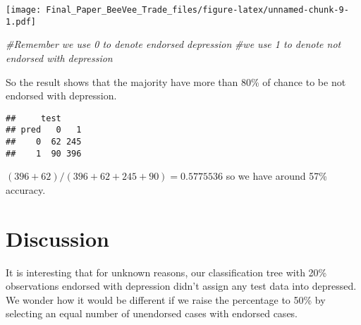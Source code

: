 \documentclass[]{article}
\newenvironment{Shaded}{\begin{snugshade}}{\end{snugshade}}
\newcommand{\KeywordTok}[1]{\textcolor[rgb]{0.13,0.29,0.53}{\textbf{#1}}}
\newcommand{\DataTypeTok}[1]{\textcolor[rgb]{0.13,0.29,0.53}{#1}}
\newcommand{\DecValTok}[1]{\textcolor[rgb]{0.00,0.00,0.81}{#1}}
\newcommand{\FloatTok}[1]{\textcolor[rgb]{0.00,0.00,0.81}{#1}}
\newcommand{\StringTok}[1]{\textcolor[rgb]{0.31,0.60,0.02}{#1}}
\newcommand{\CommentTok}[1]{\textcolor[rgb]{0.56,0.35,0.01}{\textit{#1}}}
\newcommand{\OperatorTok}[1]{\textcolor[rgb]{0.81,0.36,0.00}{\textbf{#1}}}
\newcommand{\NormalTok}[1]{#1}
\begin{document}
\texttt{[image: Final\_Paper\_BeeVee\_Trade\_files/figure-latex/unnamed-chunk-9-1.pdf]}

\begin{Shaded}
\begin{Highlighting}[]
\CommentTok{#Remember we use 0 to denote endorsed depression }
\CommentTok{#we use 1 to denote not endorsed with depression }
\end{Highlighting}
\end{Shaded}

So the result shows that the majority have more than 80\% of chance to
be not endorsed with depression.

\begin{Shaded}
\end{Shaded}

\begin{verbatim}
##     test
## pred   0   1
##    0  62 245
##    1  90 396
\end{verbatim}

\((396+62)/(396+62+245+90) = 0.5775536\) so we have around 57\%
accuracy.

\section{Discussion}\label{discussion}

It is interesting that for unknown reasons, our classification tree with
20\% observations endorsed with depression didn't assign any test data
into depressed. We wonder how it would be different if we raise the
percentage to 50\% by selecting an equal number of unendorsed cases with
endorsed cases.
\end{document}
